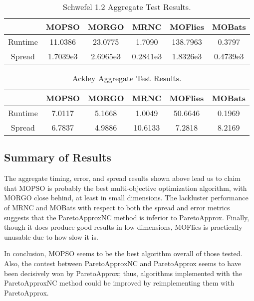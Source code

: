 \documentclass[letterpaper, 10 pt, conference]{ieeeconf}  %
\begin{document}
\vspace*{-\baselineskip} 

\begin{table}[h!]
\centering
 \begin{tabular}{||c c c c c c||} 
 \hline
 & MOPSO & MORGO & MRNC & MOFlies & MOBats \\
 \hline \hline
 Runtime & 11.0386  & 23.0775  &  1.7090  & 138.7963  & 0.3797 \\
 \hline
 Spread & 1.7039e3  &  2.6965e3  &  0.2841e3  &  1.8326e3  &  0.4739e3 \\
 \hline
\end{tabular}
\caption{Schwefel 1.2 Aggregate Test Results.}
\end{table}

\vspace*{-\baselineskip} 

\begin{table}[h!]
\centering
 \begin{tabular}{||c c c c c c||} 
 \hline
 & MOPSO & MORGO & MRNC & MOFlies & MOBats \\
 \hline \hline
 Runtime & 7.0117  &  5.1668  &  1.0049  &  50.6646  &  0.1969 \\
 \hline
 Spread & 6.7837  &  4.9886  & 10.6133  &  7.2818  &  8.2169 \\
 \hline
\end{tabular}
\caption{Ackley Aggregate Test Results.}
\end{table}


\subsection{Summary of Results}

The aggregate timing, error, and spread results shown above lead us to claim that MOPSO is probably the best multi-objective optimization algorithm, with MORGO close behind, at least in small dimensions. The lackluster performance of MRNC and MOBats with respect to both the spread and error metrics suggests that the ParetoApproxNC method is inferior to ParetoApprox. Finally, though it does produce good results in low dimensions, MOFlies is practically unusable due to how slow it is.

In conclusion, MOPSO seems to be the best algorithm overall of those tested.  Also, the contest between ParetoApproxNC and ParetoApprox seems to have been decisively won by ParetoApprox; thus, algorithms implemented with the ParetoApproxNC method could be improved by reimplementing them with ParetoApprox.  
\end{document}
